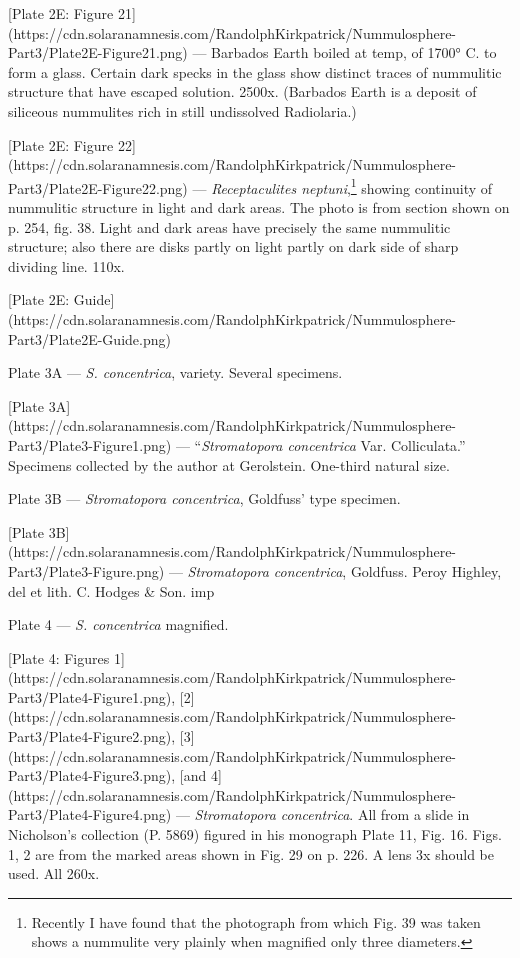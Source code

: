 \documentclass[a4paper, 12pt, oneside]{article}
\begin{document}
[Plate 2E: Figure 21](https://cdn.solaranamnesis.com/RandolphKirkpatrick/Nummulosphere-Part3/Plate2E-Figure21.png) --- Barbados Earth boiled at temp, of 1700° C. to form a glass. Certain dark specks in the glass show distinct traces of nummulitic structure that have escaped solution. 2500x. (Barbados Earth is a deposit of siliceous nummulites rich in still undissolved Radiolaria.)

[Plate 2E: Figure 22](https://cdn.solaranamnesis.com/RandolphKirkpatrick/Nummulosphere-Part3/Plate2E-Figure22.png) --- \emph{Receptaculites neptuni},\footnote{Recently I have found that the photograph from which Fig. 39 was taken shows a nummulite very plainly when magnified only three diameters.} showing continuity of nummulitic structure in light and dark areas. The photo is from section shown on p. 254, fig. 38. Light and dark areas have precisely the same nummulitic structure; also there are disks partly on light partly on dark side of sharp dividing line. 110x.

[Plate 2E: Guide](https://cdn.solaranamnesis.com/RandolphKirkpatrick/Nummulosphere-Part3/Plate2E-Guide.png)

Plate 3A --- \emph{S. concentrica}, variety. Several specimens.

[Plate 3A](https://cdn.solaranamnesis.com/RandolphKirkpatrick/Nummulosphere-Part3/Plate3-Figure1.png) --- ``\emph{Stromatopora concentrica} Var. Colliculata.'' Specimens collected by the author at Gerolstein. One-third natural size.

Plate 3B --- \emph{Stromatopora concentrica}, Goldfuss' type specimen.

[Plate 3B](https://cdn.solaranamnesis.com/RandolphKirkpatrick/Nummulosphere-Part3/Plate3-Figure.png) --- \emph{Stromatopora concentrica}, Goldfuss. Peroy Highley, del et lith. C. Hodges \& Son. imp

Plate 4 --- \emph{S. concentrica} magnified.

[Plate 4: Figures 1](https://cdn.solaranamnesis.com/RandolphKirkpatrick/Nummulosphere-Part3/Plate4-Figure1.png), [2](https://cdn.solaranamnesis.com/RandolphKirkpatrick/Nummulosphere-Part3/Plate4-Figure2.png), [3](https://cdn.solaranamnesis.com/RandolphKirkpatrick/Nummulosphere-Part3/Plate4-Figure3.png), [and 4](https://cdn.solaranamnesis.com/RandolphKirkpatrick/Nummulosphere-Part3/Plate4-Figure4.png) --- \emph{Stromatopora concentrica}. All from a slide in Nicholson's collection (P. 5869) figured in his monograph Plate 11, Fig. 16. Figs. 1, 2 are from the marked areas shown in Fig. 29 on p. 226. A lens 3x should be used. All 260x.
\end{document}
